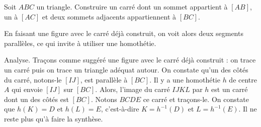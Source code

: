 \begin{exo}
Soit $ABC$ un triangle. Construire un carré dont un sommet appartient à $[AB]$, un à $[AC]$ et deux sommets adjacents appartiennent à $[BC]$.

\begin{hint}   
En faisant  une figure avec le carré déjà construit, on voit alors deux segments parallèles, ce qui invite à utiliser  une homothétie.
\end{hint}      
\begin{sol} 

Analyse. Traçons comme suggéré une figure avec le carré déjà construit : on trace un carré puis on trace un triangle adéquat autour. On constate qu'un des côtés du carré, notons-le $[IJ]$, est parallèle à $[BC]$. Il y a une homothétie $h$ de centre $A$ qui envoie $[IJ]$ sur $[BC]$. Alors, l'image du carré $IJKL$ par $h$ est un carré dont un des côtés est $[BC]$. Notons $BCDE$ ce carré et traçons-le. On constate que $h(K)=D$ et $h(L)=E$, c'est-à-dire $K=h^{-1}(D)$ et $L = h^{-1}(E)$. Il ne reste plus qu'à faire la synthèse.


\end{sol}  
\end{exo}  


